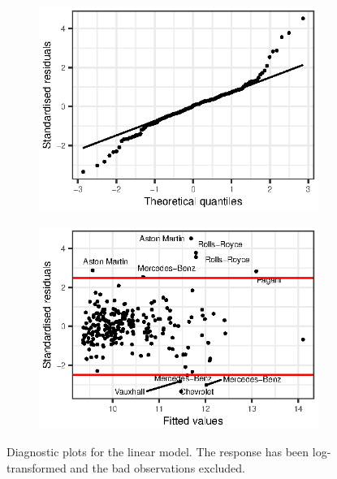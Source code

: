 \documentclass[titlepage]{article}
\begin{document}
\begin{figure}[!htb]
  \begin{subfigure}{0.5\linewidth}
    \includegraphics{q3-qq-corrected}
    \label{fig:q3-qq-corrected}
  \end{subfigure}
  \begin{subfigure}{0.5\linewidth}
    \includegraphics{q3-resids-vs-fitted-corrected}
    \label{fig:q3-resids-vs-fitted-corrected}
  \end{subfigure}
  \caption{Diagnostic plots for the linear model. The response has been log-transformed and the bad observations excluded.}
\end{figure}
\end{document}
